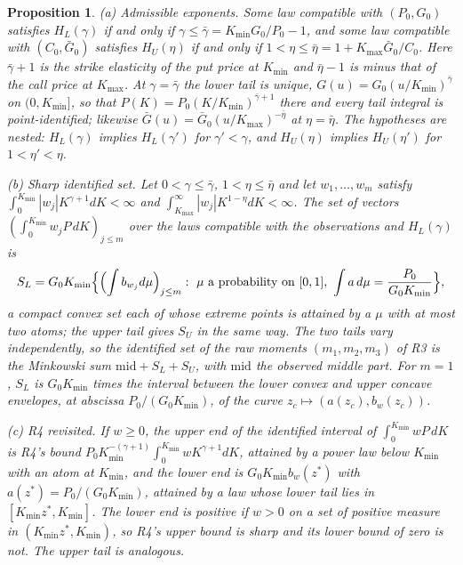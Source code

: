 \documentclass[11pt]{article}
\newtheorem{proposition}{Proposition}
\theoremstyle{remark}
\begin{document}
\begin{proposition}
(a) \emph{Admissible exponents.} Some law compatible with $(P_0,G_0)$ satisfies $H_L(\gamma)$ if and only if $\gamma\le\bar\gamma=K_{\min}G_0/P_0-1$, and some law compatible with $(C_0,\bar G_0)$ satisfies $H_U(\eta)$ if and only if $1<\eta\le\bar\eta=1+K_{\max}\bar G_0/C_0$. Here $\bar\gamma+1$ is the strike elasticity of the put price at $K_{\min}$ and $\bar\eta-1$ is minus that of the call price at $K_{\max}$. At $\gamma=\bar\gamma$ the lower tail is unique, $G(u)=G_0(u/K_{\min})^{\bar\gamma}$ on $(0,K_{\min}]$, so that $P(K)=P_0(K/K_{\min})^{\bar\gamma+1}$ there and every tail integral is point-identified; likewise $\bar G(u)=\bar G_0(u/K_{\max})^{-\bar\eta}$ at $\eta=\bar\eta$. The hypotheses are nested: $H_L(\gamma)$ implies $H_L(\gamma')$ for $\gamma'<\gamma$, and $H_U(\eta)$ implies $H_U(\eta')$ for $1<\eta'<\eta$.

(b) \emph{Sharp identified set.} Let $0<\gamma\le\bar\gamma$, $1<\eta\le\bar\eta$ and let $w_1,\dots,w_m$ satisfy $\int_0^{K_{\min}}|w_j|K^{\gamma+1}dK<\infty$ and $\int_{K_{\max}}^\infty|w_j|K^{1-\eta}dK<\infty$. The set of vectors $(\int_0^{K_{\min}}w_jP\,dK)_{j\le m}$ over the laws compatible with the observations and $H_L(\gamma)$ is
\[
S_L=G_0K_{\min}\Bigl\{\Bigl(\int b_{w_j}d\mu\Bigr)_{j\le m}:\ \mu\text{ a probability on }[0,1],\ \int a\,d\mu=\frac{P_0}{G_0K_{\min}}\Bigr\},
\]
a compact convex set each of whose extreme points is attained by a $\mu$ with at most two atoms; the upper tail gives $S_U$ in the same way. The two tails vary independently, so the identified set of the raw moments $(m_1,m_2,m_3)$ of R3 is the Minkowski sum $\mathrm{mid}+S_L+S_U$, with $\mathrm{mid}$ the observed middle part. For $m=1$, $S_L$ is $G_0K_{\min}$ times the interval between the lower convex and upper concave envelopes, at abscissa $P_0/(G_0K_{\min})$, of the curve $z_c\mapsto(a(z_c),b_w(z_c))$.

(c) \emph{R4 revisited.} If $w\ge0$, the upper end of the identified interval of $\int_0^{K_{\min}}wP\,dK$ is R4's bound $P_0K_{\min}^{-(\gamma+1)}\int_0^{K_{\min}}wK^{\gamma+1}dK$, attained by a power law below $K_{\min}$ with an atom at $K_{\min}$, and the lower end is $G_0K_{\min}b_w(z^*)$ with $a(z^*)=P_0/(G_0K_{\min})$, attained by a law whose lower tail lies in $[K_{\min}z^*,K_{\min}]$. The lower end is positive if $w>0$ on a set of positive measure in $(K_{\min}z^*,K_{\min})$, so R4's upper bound is sharp and its lower bound of zero is not. The upper tail is analogous.


\end{proposition}
\end{document}
